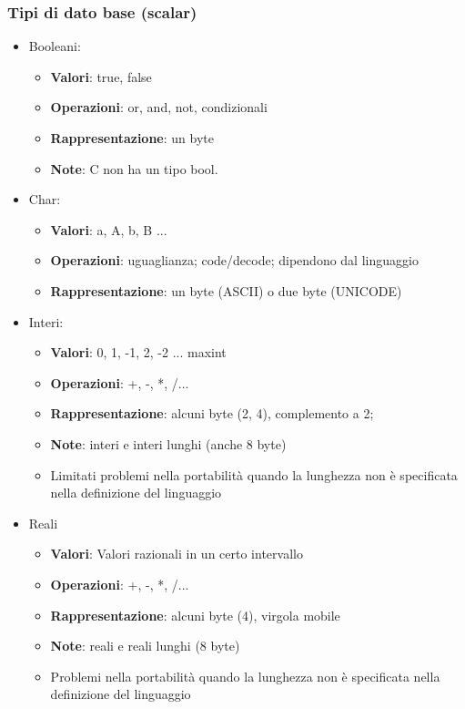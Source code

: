 \documentclass[a4paper,10pt]{article}
\begin{document}
\subsubsection{Tipi di dato base (scalar)}
\begin{itemize}
 \item Booleani:
 \begin{itemize}
  \item \textbf{Valori}: true, false
  \item \textbf{Operazioni}: or, and, not, condizionali
  \item \textbf{Rappresentazione}: un byte
  \item \textbf{Note}: C non ha un tipo bool.
  \end{itemize}
 \item Char:
 \begin{itemize}
  \item \textbf{Valori}: a, A, b, B ...
  \item \textbf{Operazioni}: uguaglianza; code/decode; dipendono dal linguaggio
  \item \textbf{Rappresentazione}: un byte (ASCII) o due byte (UNICODE)
  \end{itemize}

  \item Interi:
 \begin{itemize}
  \item \textbf{Valori}: 0, 1, -1, 2, -2 ... maxint
  \item \textbf{Operazioni}: +, -, *, /...
  \item \textbf{Rappresentazione}: alcuni byte (2, 4), complemento a 2;
  \item \textbf{Note}: interi e interi lunghi (anche 8 byte)
  \item Limitati problemi nella portabilità quando la lunghezza non è specificata nella
definizione del linguaggio
  \end{itemize}
  \item Reali
 \begin{itemize}
  \item \textbf{Valori}: Valori razionali in un certo intervallo
  \item \textbf{Operazioni}: +, -, *, /...
  \item \textbf{Rappresentazione}: alcuni byte (4), virgola mobile
  \item \textbf{Note}: reali e reali lunghi (8 byte)
  \item Problemi nella portabilità quando la lunghezza non è specificata nella
definizione del linguaggio
  \end{itemize}
\end{itemize}
\end{document}
